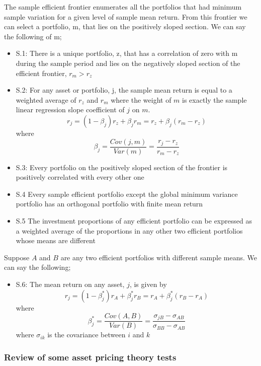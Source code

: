 The sample efficient frontier enumerates all the portfolios that had minimum sample
variation for a given level of sample mean return. From this frontier we can select a
portfolio, m, that lies on the positively sloped section. We can say the following of m;
\begin{itemize}
    \item S.1: There is a unique portfolio, z, that has a correlation of zero with m
    during the sample period and lies on the negatively sloped section of the efficient
    frontier, $r_m > r_z$
    \item S.2: For any asset or portfolio, j, the sample mean return is equal to a
    weighted average of $r_z$ and $r_m$ where the weight of $m$ is exactly the sample
    linear regression slope coefficient of $j$ on $m$.
    $$r_j = (1-\beta_j)r_z + \beta_j r_m = r_z + \beta_j(r_m - r_z)$$
    where
    $$\beta_j = \frac{Cov(j, m)}{Var(m)} = \frac{r_j - r_z}{r_m - r_z}$$
    \item S.3: Every portfolio on the positively sloped section of the frontier is positively correlated with every other one
    \item S.4 Every sample efficient portfolio except the global minimum variance portfolio has an orthogonal portfolio with finite mean return
    \item S.5 The investment proportions of any efficient portfolio can be expressed as a
    weighted average of the proportions in any other two efficient portfolios whose means
    are different
\end{itemize}

Suppose $A$ and $B$ are any two efficient portfolios with different sample means. We can
say the following;
\begin{itemize}
    \item S.6: The mean return on any asset, $j$, is given by
    $$r_j = (1-\beta^*_j)r_A + \beta^*_j r_B = r_A + \beta^*_j(r_B - r_A)$$
    where
    $$\beta^*_j = \frac{Cov(A, B)}{Var(B)} =
        \frac{\sigma_{jB} - \sigma_{AB}}{\sigma_{BB} - \sigma_{AB}}$$
    where $\sigma_{ik}$ is the covariance between $i$ and $k$
\end{itemize}

\subsubsection{Review of some asset pricing theory tests}

